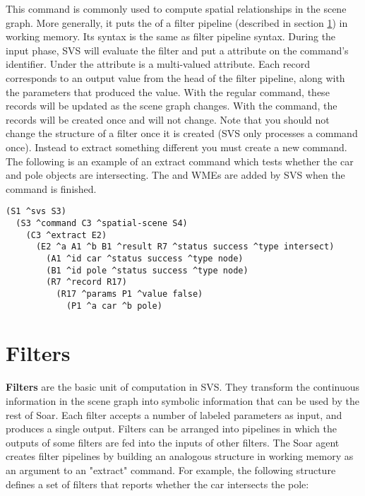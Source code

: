 This command is commonly used to compute spatial relationships in the scene graph.
More generally, it puts the  of a filter pipeline (described in section \ref{sec:svs-filters}) in working memory.
Its syntax is the same as filter pipeline syntax.
During the input phase, SVS will evaluate the filter and
put a  attribute on the command's identifier.
Under the  attribute is a multi-valued  attribute.
Each record corresponds to an output value from the head of the filter pipeline, along with the parameters that produced the value.
With the regular  command, these records will be updated as the scene graph
changes. With the  command, the records will be created once
and will not change.
Note that you should not change the structure of a filter once it is created
(SVS only processes a command once).
Instead to extract something different you must create a new command.
The following is an example of an extract command which tests whether the
car and pole objects are intersecting. The  and  WMEs are
added by SVS when the command is finished.

\begin{verbatim}
(S1 ^svs S3)
  (S3 ^command C3 ^spatial-scene S4)
    (C3 ^extract E2)
      (E2 ^a A1 ^b B1 ^result R7 ^status success ^type intersect)
        (A1 ^id car ^status success ^type node)
        (B1 ^id pole ^status success ^type node)
        (R7 ^record R17)
          (R17 ^params P1 ^value false)
            (P1 ^a car ^b pole)
\end{verbatim}


\section{Filters}
\label{sec:svs-filters}

\textbf{Filters} are the basic unit of computation in SVS.
They transform the continuous information in the scene graph into symbolic information that can be used by the rest of Soar.
Each filter accepts a number of labeled parameters as input, and produces a single output.
Filters can be arranged into pipelines in which the outputs of some filters are fed into the inputs of other filters.
The Soar agent creates filter pipelines by building an analogous structure in working memory as an argument to an "extract" command.
For example, the following structure defines a set of filters that reports whether the car intersects the pole:

